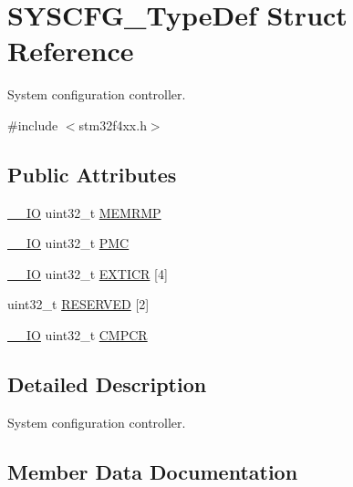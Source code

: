 \hypertarget{struct_s_y_s_c_f_g___type_def}{}\section{S\+Y\+S\+C\+F\+G\+\_\+\+Type\+Def Struct Reference}
\label{struct_s_y_s_c_f_g___type_def}


System configuration controller.  




{\ttfamily \#include $<$stm32f4xx.\+h$>$}

\subsection*{Public Attributes}
\begin{DoxyCompactItemize}
\item 
\hyperlink{core__cm4_8h_aec43007d9998a0a0e01faede4133d6be}{\+\_\+\+\_\+\+IO} uint32\+\_\+t \hyperlink{struct_s_y_s_c_f_g___type_def_a85b9d3df2274b730327b181c402a7bf5}{M\+E\+M\+R\+MP}
\item 
\hyperlink{core__cm4_8h_aec43007d9998a0a0e01faede4133d6be}{\+\_\+\+\_\+\+IO} uint32\+\_\+t \hyperlink{struct_s_y_s_c_f_g___type_def_ab5c47c570566cb8ff9d0436c17cc9241}{P\+MC}
\item 
\hyperlink{core__cm4_8h_aec43007d9998a0a0e01faede4133d6be}{\+\_\+\+\_\+\+IO} uint32\+\_\+t \hyperlink{struct_s_y_s_c_f_g___type_def_a66a06b3aab7ff5c8fa342f7c1994bf7d}{E\+X\+T\+I\+CR} \mbox{[}4\mbox{]}
\item 
uint32\+\_\+t \hyperlink{struct_s_y_s_c_f_g___type_def_a43926e6d31a976a0018b2d1f5c92645d}{R\+E\+S\+E\+R\+V\+ED} \mbox{[}2\mbox{]}
\item 
\hyperlink{core__cm4_8h_aec43007d9998a0a0e01faede4133d6be}{\+\_\+\+\_\+\+IO} uint32\+\_\+t \hyperlink{struct_s_y_s_c_f_g___type_def_ada13497abc6402300570ff5f430a612e}{C\+M\+P\+CR}
\end{DoxyCompactItemize}


\subsection{Detailed Description}
System configuration controller. 

\subsection{Member Data Documentation}
